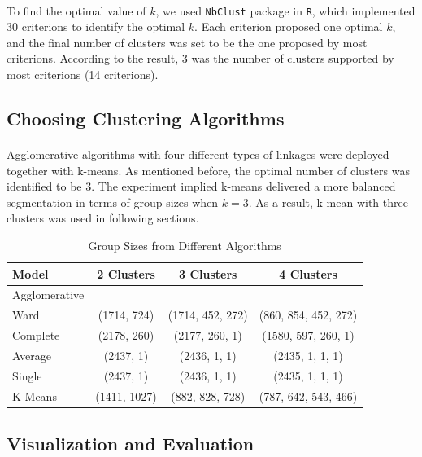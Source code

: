 \documentclass[11pt]{article}
\begin{document}
	\paragraph{} To find the optimal value of $k$, we used \texttt{NbClust} package in \texttt{R}, which implemented 30 criterions to identify the optimal $k$. Each criterion proposed one optimal $k$, and the final number of clusters was set to be the one proposed by most criterions. According to the result, 3 was the number of clusters supported by most criterions (14 criterions).

	\subsection{Choosing Clustering Algorithms}
	\paragraph{} Agglomerative algorithms with four different types of linkages were deployed together with k-means. As mentioned before, the optimal number of clusters was identified to be 3. The experiment implied k-means delivered a more balanced segmentation in terms of group sizes when $k=3$. As a result, k-mean with three clusters was used in following sections.
	
	\begin{table}[H]
		\centering
		\begin{tabular}{l|c|c|c}
			Model & 2 Clusters & 3 Clusters & 4 Clusters \\
			\hline
			\hline
			Agglomerative \\
			\hline
			Ward & (1714, 724) & (1714, 452, 272) & (860, 854, 452, 272) \\
			Complete & (2178, 260) & (2177, 260, 1) & (1580, 597, 260, 1) \\
			Average & (2437, 1) & (2436, 1, 1) & (2435, 1, 1, 1) \\
			Single & (2437, 1) & (2436, 1, 1) & (2435, 1, 1, 1) \\
			\hline
			\hline
			K-Means & (1411, 1027) & (882, 828, 728) & (787, 642, 543, 466)
		\end{tabular}
		\caption{Group Sizes from Different Algorithms}
	\end{table}
	
	\subsection{Visualization and Evaluation}
\end{document}
